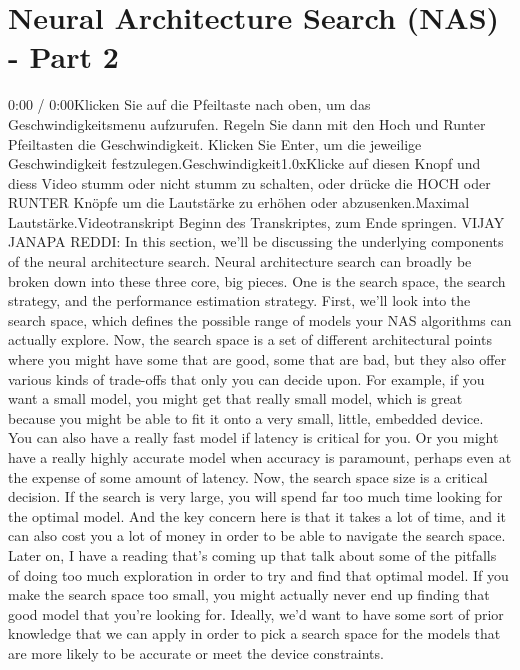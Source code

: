 {{{{\section{Neural Architecture Search (NAS) - Part 2}

    0:00 / 0:00Klicken Sie auf die Pfeiltaste nach oben, um das Geschwindigkeitsmenu aufzurufen. Regeln Sie dann mit den Hoch und Runter Pfeiltasten die Geschwindigkeit. Klicken Sie Enter, um die jeweilige Geschwindigkeit festzulegen.Geschwindigkeit1.0xKlicke auf diesen Knopf und diess Video stumm oder nicht stumm zu schalten, oder drücke die HOCH oder RUNTER Knöpfe um die Lautstärke zu erhöhen oder abzusenken.Maximal Lautstärke.Videotranskript
    Beginn des Transkriptes, zum Ende springen.
    VIJAY JANAPA REDDI: In this section, we'll
    be discussing the underlying components of the neural architecture search.
    Neural architecture search can broadly be broken down
    into these three core, big pieces.
    One is the search space, the search strategy, and the performance
    estimation strategy.
    First, we'll look into the search space, which
    defines the possible range of models your NAS algorithms can actually
    explore.
    Now, the search space is a set of different architectural points
    where you might have some that are good, some that are bad,
    but they also offer various kinds of trade-offs
    that only you can decide upon.
    For example, if you want a small model, you
    might get that really small model, which is great
    because you might be able to fit it onto a very small, little, embedded device.
    You can also have a really fast model if latency is critical for you.
    Or you might have a really highly accurate model
    when accuracy is paramount, perhaps even at the expense
    of some amount of latency.
    Now, the search space size is a critical decision.
    If the search is very large, you will spend far too much time
    looking for the optimal model.
    And the key concern here is that it takes a lot of time,
    and it can also cost you a lot of money in order
    to be able to navigate the search space.
    Later on, I have a reading that's coming up
    that talk about some of the pitfalls of doing too much exploration
    in order to try and find that optimal model.
    If you make the search space too small, you
    might actually never end up finding that good model that you're looking for.
    Ideally, we'd want to have some sort of prior knowledge
    that we can apply in order to pick a search space for the models that
    are more likely to be accurate or meet the device constraints.
}}}}
